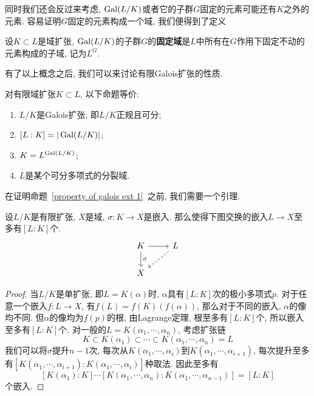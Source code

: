 同时我们还会反过来考虑, $\operatorname{Gal}(L/K)$或者它的子群$G$固定的元素可能还有$K$之外的元素.
容易证明$G$固定的元素构成一个域, 我们便得到了定义
\begin{defn}
    设$K\subset L$是域扩张, $\operatorname{Gal}(L/K)$的子群$G$的\textbf{固定域}是$L$中所有在$G$作用下固定不动的元素构成的子域, 记为$L^G$.
\end{defn}

有了以上概念之后, 我们可以来讨论有限Galois扩张的性质.

\begin{prop}\label{property of galois ext 1}
    对有限域扩张$K\subset L$, 以下命题等价:
    \begin{enumerate}[\rm (1)]
        \item $L/K$是Galois扩张, 即$L/K$正规且可分;
        \item $[L:K]=|\operatorname{Gal}(L/K)|$;
        \item $K=L^{\operatorname{Gal}(L/K)}$;
        \item $L$是某个可分多项式的分裂域.
    \end{enumerate}
\end{prop}

在证明命题~\ref{property of galois ext 1}~之前, 我们需要一个引理.

\begin{lem}\label{artin}
    设$L/K$是有限扩张, $X$是域, $\sigma:K\to X$是嵌入.
    那么使得下图交换的嵌入$L\to X$至多有$[L:K]$个.
    \[\begin{tikzcd}
        K \ar[r] \ar[d,"\sigma"] & L \ar[ld, dashed] \\
        X & 
    \end{tikzcd}\]
\end{lem}
\begin{proof}
    当$L/K$是单扩张, 即$L=K(\alpha)$时, $\alpha$具有$[L:K]$次的极小多项式$p$.
    对于任意一个嵌入$f:L\to X$, 有$f(L)=f(K)(f(\alpha))$, 那么对于不同的嵌入, $\alpha$的像均不同.
    但$\alpha$的像均为$f(p)$的根, 由Lagrange定理, 根至多有$[L:K]$个, 所以嵌入至多有$[L:K]$个.
    对一般的$L=K(\alpha_1,\cdots,\alpha_n)$, 考虑扩张链
    \[K\subset K(\alpha_1)\subset\cdots\subset K(\alpha_1,\cdots,\alpha_n)=L\]
    我们可以将$\sigma$提升$n-1$次, 每次从$K(\alpha_1,\cdots,\alpha_{i})$到$K(\alpha_1,\cdots,\alpha_{i+1})$, 每次提升至多有$[K(\alpha_1,\cdots,\alpha_{i+1}):K(\alpha_1,\cdots,\alpha_{i})]$种取法.
    因此至多有
    \[[K(\alpha_1):K]\cdots[K(\alpha_1,\cdots,\alpha_{n}):K(\alpha_1,\cdots,\alpha_{n-1})]=[L:K]\]
    个嵌入.
\end{proof}

